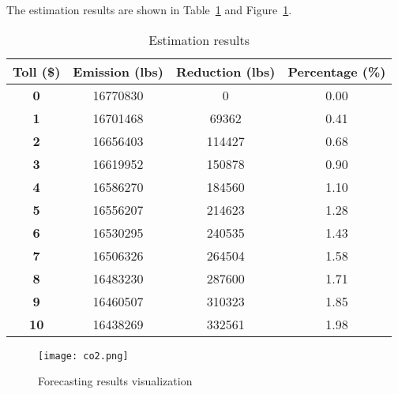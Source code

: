 \documentclass[11pt]{article}
\begin{document}
\subsubsection{}
The estimation results are shown in Table~\ref{tb:co2} and Figure~\ref{fig:co2}.
\begin{table}[H]
	\centering
	\caption{\label{tb:co2}Estimation results}
	\vspace{5pt}
	\begin{tabular}{|c|c|c|c|}      
		\hline                                                
		\textbf{Toll (\$)} &  \textbf{Emission (lbs)} &  \textbf{Reduction (lbs)} & \textbf{Percentage (\%)} \\\hline
		\textbf{0}        &  16770830 &          0 &      0.00 \\\hline
		\textbf{1}        &  16701468 &      69362 &      0.41 \\\hline
		\textbf{2}        &  16656403 &     114427 &      0.68 \\\hline
		\textbf{3}        &  16619952 &     150878 &      0.90 \\\hline
		\textbf{4}        &  16586270 &     184560 &      1.10 \\\hline
		\textbf{5}        &  16556207 &     214623 &      1.28 \\\hline
		\textbf{6}        &  16530295 &     240535 &      1.43 \\\hline
		\textbf{7}        &  16506326 &     264504 &      1.58 \\\hline
		\textbf{8}        &  16483230 &     287600 &      1.71 \\\hline
		\textbf{9}        &  16460507 &     310323 &      1.85 \\\hline
		\textbf{10}       &  16438269 &     332561 &      1.98 \\\hline
	\end{tabular}
\end{table}
\begin{figure}[H]
	\centering
	\texttt{[image: co2.png]}
	\vspace{-0.5cm}
	\caption{Forecasting results visualization}\label{fig:co2}	
\end{figure}
\end{document}

